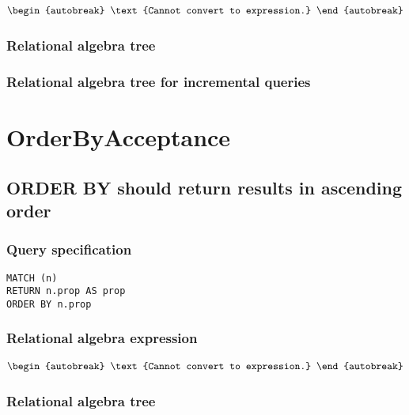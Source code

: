 \begin{align*}
\begin{autobreak}
\text{Cannot convert to expression.}
\end{autobreak}
\end{align*}

\subsubsection*{Relational algebra tree}


\subsubsection*{Relational algebra tree for incremental queries}

\section{OrderByAcceptance}


\subsection{ORDER BY should return results in ascending order}

\subsubsection*{Query specification}

\begin{lstlisting}
MATCH (n)
RETURN n.prop AS prop
ORDER BY n.prop
\end{lstlisting}

\subsubsection*{Relational algebra expression}

\begin{align*}
\begin{autobreak}
\text{Cannot convert to expression.}
\end{autobreak}
\end{align*}

\subsubsection*{Relational algebra tree}


